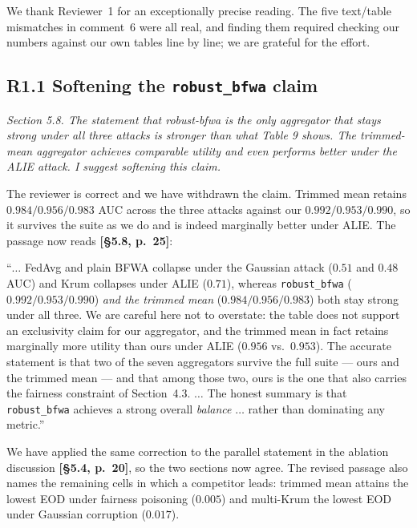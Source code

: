 \documentclass[11pt,a4paper]{article}
\newenvironment{comment}
  {\begin{mdframed}[backgroundcolor=quotegray,linewidth=0pt,skipabove=8pt,
    skipbelow=6pt,innertopmargin=6pt,innerbottommargin=6pt]\itshape}
  {\end{mdframed}}
\newenvironment{newtextbox}
  {\begin{mdframed}[linecolor=newtext!45,linewidth=0.8pt,skipabove=6pt,
    skipbelow=8pt,innertopmargin=6pt,innerbottommargin=6pt]\small}
  {\end{mdframed}}
\newcommand{\where}[1]{\textcolor{revblue}{\textbf{[#1]}}}
\begin{document}
We thank Reviewer~1 for an exceptionally precise reading. The five text/table
mismatches in comment~6 were all real, and finding them required checking our
numbers against our own tables line by line; we are grateful for the effort.

\subsection*{R1.1 Softening the \texttt{robust\_bfwa} claim}
\label{sec:r1-1}

\begin{comment}
Section 5.8. The statement that robust-bfwa is the only aggregator that stays
strong under all three attacks is stronger than what Table 9 shows. The
trimmed-mean aggregator achieves comparable utility and even performs better
under the ALIE attack. I suggest softening this claim.
\end{comment}

The reviewer is correct and we have withdrawn the claim. Trimmed mean retains
$0.984/0.956/0.983$ AUC across the three attacks against our $0.992/0.953/0.990$,
so it survives the suite as we do and is indeed marginally better under ALIE. The
passage now reads \where{\S5.8, p.~25}:

\begin{newtextbox}
``$\dots$ FedAvg and plain BFWA collapse under the Gaussian attack ($0.51$ and
$0.48$ AUC) and Krum collapses under ALIE ($0.71$), whereas
\texttt{robust\_bfwa} ($0.992/0.953/0.990$) \emph{and the trimmed mean}
($0.984/0.956/0.983$) both stay strong under all three. We are careful here not
to overstate: the table does not support an exclusivity claim for our
aggregator, and the trimmed mean in fact retains marginally more utility than
ours under ALIE ($0.956$ vs.\ $0.953$). The accurate statement is that two of
the seven aggregators survive the full suite --- ours and the trimmed mean ---
and that among those two, ours is the one that also carries the fairness
constraint of Section~4.3. $\dots$ The honest summary is that
\texttt{robust\_bfwa} achieves a strong overall \emph{balance} $\dots$ rather
than dominating any metric.''
\end{newtextbox}

We have applied the same correction to the parallel statement in the ablation
discussion \where{\S5.4, p.~20}, so the two sections now agree. The revised
passage also names the remaining cells in which a competitor leads: trimmed mean
attains the lowest EOD under fairness poisoning ($0.005$) and multi-Krum the
lowest EOD under Gaussian corruption ($0.017$).
\end{document}

